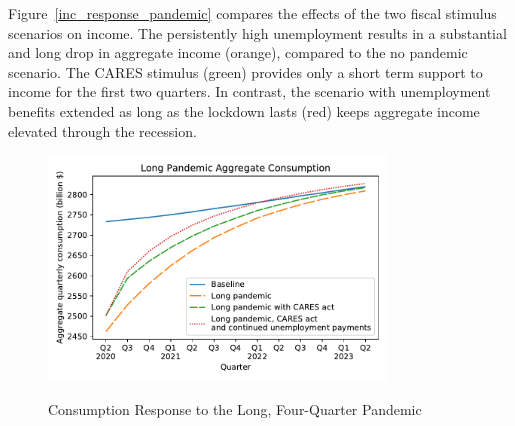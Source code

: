 Figure~\ref{inc_response_pandemic} compares the effects of the two fiscal stimulus scenarios on income. 
The persistently high unemployment results in a substantial and long drop in aggregate income (orange), compared to the no pandemic scenario. 
The CARES stimulus (green) provides only a short term support to income for the first two quarters. 
In contrast, the scenario with unemployment benefits extended as long as the lockdown lasts (red) keeps aggregate income elevated through the recession.

\begin{figure}
	\centering
	\caption{Consumption Response to the Long, Four-Quarter Pandemic}
	\label{cons_response_pandemic}
	{ \includegraphics[width=0.8\textwidth]{./Figures/DeepPandemic}}
\end{figure}

